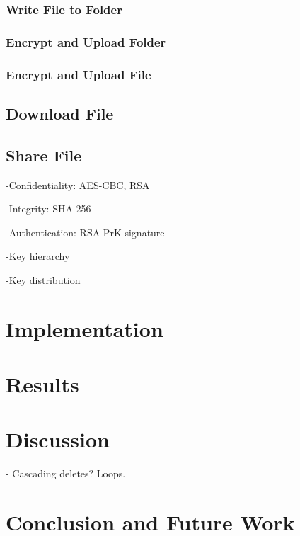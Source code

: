 \documentclass[english,12pt,a4paper]{book}
\begin{document}
\subsection{Write File to Folder}

\subsection{Encrypt and Upload Folder}

\subsection{Encrypt and Upload File}

\section{Download File}

\section{Share File}
{
-Confidentiality: AES-CBC, RSA

-Integrity: SHA-256

-Authentication: RSA PrK signature

-Key hierarchy

-Key distribution
}

\chapter{Implementation}

\chapter{Results}

\chapter{Discussion}

- Cascading deletes? Loops.

\chapter{Conclusion and Future Work}




\appendix
\appendixpage
\addappheadtotoc
\end{document}
